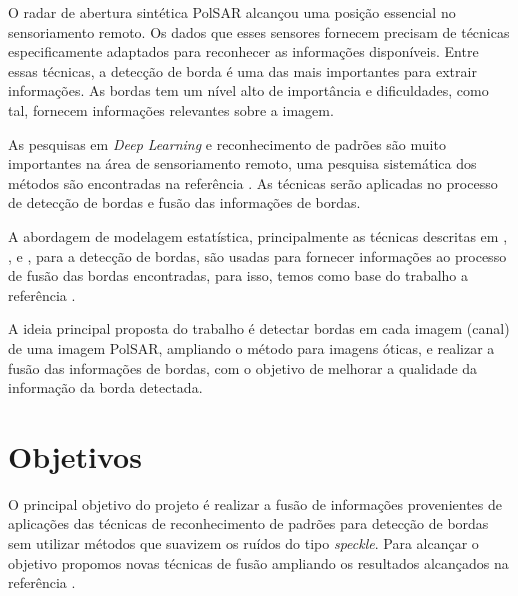 \documentclass[runningheads]{llncs}
\begin{document}
O radar de abertura sintética PolSAR alcançou uma posição essencial no sensoriamento remoto. Os dados que esses sensores fornecem precisam de técnicas especificamente adaptados para reconhecer as informações disponíveis. Entre essas técnicas, a detecção de borda é uma das mais importantes para extrair informações. As bordas tem um nível alto de importância e dificuldades, como tal, fornecem informações relevantes sobre a imagem.

As pesquisas em \textit{Deep Learning} e reconhecimento de padrões são muito importantes na área de sensoriamento remoto, uma pesquisa sistemática dos métodos são encontradas na referência \cite{ztmxzxf}. 
As técnicas serão aplicadas no processo de detecção de bordas e fusão das informações de bordas. 

A abordagem de modelagem estatística, principalmente as técnicas descritas em \cite{bmf_2020}, \cite{nhfc},  e \cite{ref_proc3}, para a detecção de bordas, são usadas para fornecer informações ao processo de fusão das bordas encontradas, para isso, temos como base do trabalho a referência \cite{ref_proc4}. 

A ideia principal proposta do trabalho é detectar bordas em cada imagem (canal) de uma imagem PolSAR, ampliando o método para imagens óticas, e realizar a fusão das informações de bordas, com o objetivo de melhorar a qualidade da informação da borda detectada.

\section{Objetivos}

O principal objetivo do projeto é realizar a fusão de informações provenientes de aplicações das técnicas de reconhecimento de padrões para detecção de bordas sem utilizar métodos que suavizem os ruídos do tipo \textit{speckle}. Para alcançar o objetivo propomos novas técnicas de fusão ampliando os resultados alcançados na referência \cite{bmf_2020}.
\end{document}
